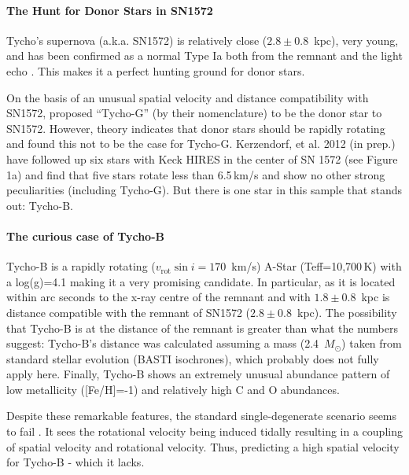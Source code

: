 \documentclass[12pt]{article}
\begin{document}
\vspace{-5mm}
\paragraph{The Hunt for Donor Stars in SN1572}
Tycho's supernova (a.k.a. SN1572) is relatively close ($2.8\pm0.8$~kpc), very young, and has been confirmed as a normal Type Ia both from the remnant \citep{2006ApJ...645.1373B} and the light echo \citep{2008ApJ...681L..81R,2008Natur.456..617K}. This makes it a perfect hunting ground for donor stars.

On the basis of an unusual spatial velocity and distance compatibility with SN1572, \citet{2004Natur.431.1069R} proposed ``Tycho-G'' (by their nomenclature) to be the donor star to SN1572.  However, theory indicates that donor stars should be rapidly rotating and \citet{2009ApJ...701.1665K} found this not to be the case for Tycho-G. Kerzendorf, et al. 2012 (in prep.) have followed up six stars with Keck HIRES in the center of SN 1572 (see Figure 1a) and find that five stars rotate less than 6.5\,km/s and show no other strong peculiarities (including Tycho-G). But there is one star in this sample that stands out: Tycho-B.

\vspace{-5mm}
\paragraph{The curious case of Tycho-B}
Tycho-B is a rapidly rotating ($v_\textrm{rot} \sin{i}=170$~km/s) A-Star (Teff=10,700\,K) with a log(g)=4.1 making it a very promising candidate. In particular, as it is located within arc seconds to the x-ray centre of the remnant and with $1.8\pm 0.8$~kpc is distance compatible with the remnant of SN1572 ($2.8\pm0.8$~kpc). The possibility that Tycho-B is at the distance of the remnant is greater than what the numbers suggest: Tycho-B's distance was calculated assuming a mass (2.4~$M_\odot$) taken from standard stellar evolution (BASTI isochrones), which probably does not fully apply here. Finally, Tycho-B shows an extremely unusual abundance pattern of low metallicity ([Fe/H]=-1) and relatively high C and O abundances.

Despite these remarkable features, the standard single-degenerate scenario seems to fail \citep{2012arXiv1210.2713K}.  It sees the rotational velocity being induced tidally resulting in a coupling of spatial velocity and rotational velocity. Thus, predicting a high spatial velocity for Tycho-B - which it lacks. 
\end{document}

